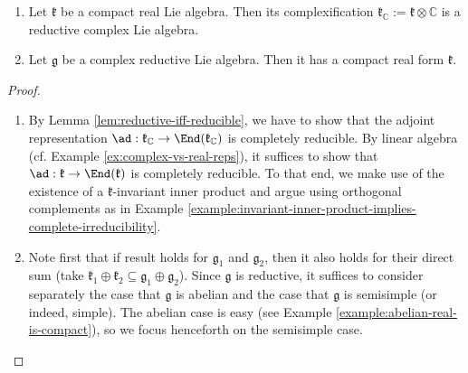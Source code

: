 \documentclass[reqno]{amsart} 
\begin{document}
\begin{theorem}
  \begin{enumerate}
  \item Let $\mathfrak{k}$ be a compact real Lie algebra.  Then its complexification $\mathfrak{k}_\mathbb{C} := \mathfrak{k} \otimes \mathbb{C}$ is a reductive complex Lie algebra.
  \item Let $\mathfrak{g}$ be a complex reductive Lie algebra.  Then it has a compact real form $\mathfrak{k}$.
  \end{enumerate}
\end{theorem}
\begin{proof}
  \begin{enumerate}
  \item By Lemma \ref{lem:reductive-iff-reducible}, we have to show that the adjoint representation $\ad : \mathfrak{k} _\mathbb{C} \rightarrow \End(\mathfrak{k}_\mathbb{C})$ is completely reducible.  By linear algebra (cf. Example \ref{ex:complex-vs-real-reps}), it suffices to show that $\ad : \mathfrak{k} \rightarrow \End(\mathfrak{k})$ is completely reducible.  To that end, we make use of the existence of a $\mathfrak{k}$-invariant inner product and argue using orthogonal complements as in Example \ref{example:invariant-inner-product-implies-complete-irreducibility}.
  \item Note first that if result holds for $\mathfrak{g}_1$ and $\mathfrak{g}_2$, then it also holds for their direct sum (take $\mathfrak{k}_1 \oplus \mathfrak{k}_2 \subseteq \mathfrak{g}_1 \oplus \mathfrak{g}_2$).  Since $\mathfrak{g}$ is reductive, it suffices to consider separately the case that $\mathfrak{g}$ is abelian and the case that $\mathfrak{g}$ is semisimple (or indeed, simple).  The abelian case is easy (see Example \ref{example:abelian-real-is-compact}), so we focus henceforth on the semisimple case.


\end{enumerate}
\end{proof}
\end{document}

